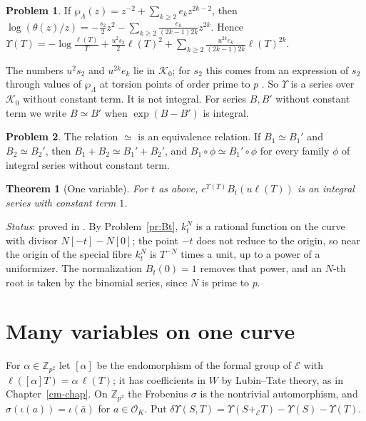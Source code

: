 \documentclass[reqno]{amsart}
\newcounter{chap}
\theoremstyle{definition}
\newtheorem{problem}{Problem}[section]
\theoremstyle{plain}
\newtheorem{theorem}{Theorem}[section]
\theoremstyle{remark}
\newcommand{\Z}{\mathbb Z}
\newcommand{\Oc}{\mathcal O}
\newcommand{\Kc}{\mathcal K}
\newcommand{\Ec}{\mathcal E}
\newcommand{\pe}{+_{\Ec}}
\begin{document}
\begin{problem}\label{pr:log-theta}
If \(\wp_\Lambda(z)=z^{-2}+\sum_{k\ge2}e_kz^{2k-2}\), then \(\log(\theta(z)/z)=-\frac{s_2}2z^2-\sum_{k\ge2}\frac{e_k}{(2k-1)2k}z^{2k}\).  Hence
\(\Upsilon(T)=-\log\frac{\ell(T)}T+\frac{u^2s_2}2\ell(T)^2+\sum_{k\ge2}\frac{u^{2k}e_k}{(2k-1)2k}\ell(T)^{2k}\).
\end{problem}

The numbers \(u^2s_2\) and \(u^{2k}e_k\) lie in \(\Kc_0\); for \(s_2\) this comes from an expression of \(s_2\) through values of \(\wp_\Lambda\) at torsion points of order prime to \(p\) \cite[Lemma~8.3(iv) and \S8.2]{Adr}.  So \(\Upsilon\) is a series over \(\Kc_0\) without constant term.  It is not integral.  For series \(B,B'\) without constant term we write \(B\simeq B'\) when \(\exp(B-B')\) is integral.

\begin{problem}\label{pr:simeq}
The relation \(\simeq\) is an equivalence relation.  If \(B_1\simeq B_1'\) and \(B_2\simeq B_2'\), then \(B_1+B_2\simeq B_1'+B_2'\), and \(B_1\circ\phi\simeq B_1'\circ\phi\) for every family \(\phi\) of integral series without constant term.
\end{problem}

\begin{theorem}[One variable]\label{thm:one}
For \(t\) as above, \(e^{\Upsilon(T)}B_t(u\ell(T))\) is an integral series with constant term \(1\).
\end{theorem}
\noindent\emph{Status}: proved in \cite[Prop.~8.8]{Adr}.  By Problem~\ref{pr:Bt}, \(k_t^N\) is a rational function on the curve with divisor \(N[-t]-N[0]\); the point \(-t\) does not reduce to the origin, so near the origin of the special fibre \(k_t^N\) is \(T^{-N}\) times a unit, up to a power of a uniformizer.  The normalization \(B_t(0)=1\) removes that power, and an \(N\)-th root is taken by the binomial series, since \(N\) is prime to \(p\).

\section{Many variables on one curve}\label{sec:rules}
For \(\alpha\in\Z_{p^2}\) let \([\alpha]\) be the endomorphism of the formal group of \(\Ec\) with \(\ell([\alpha]T)=\alpha\,\ell(T)\); it has coefficients in \(W\) by Lubin--Tate theory, as in Chapter~\ref{cm-chap}.  On \(\Z_{p^2}\) the Frobenius \(\sigma\) is the nontrivial automorphism, and \(\sigma(\iota(a))=\iota(\bar a)\) for \(a\in\Oc_K\).  Put \(\delta\Upsilon(S,T)=\Upsilon(S\pe T)-\Upsilon(S)-\Upsilon(T)\).
\end{document}
